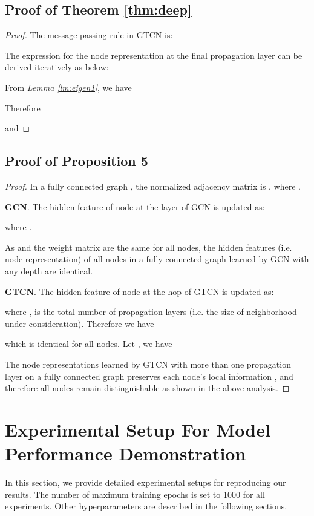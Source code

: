 \documentclass[lettersize,journal]{IEEEtran}
\theoremstyle{plain}
\theoremstyle{definition}
\theoremstyle{remark}
\begin{document}
\subsection{Proof of Theorem \ref{thm:deep}}
\begin{proof}
	The message passing rule in GTCN is:
	

The expression for the node representation at the final propagation layer can be derived iteratively as below:


From \textit{Lemma \ref{lm:eigen1}}, we have


Therefore

and

\end{proof}

\subsection{Proof of Proposition 5}

\begin{proof}
	In a fully connected graph , the normalized adjacency matrix is , where .
	
	\textbf{GCN}. The hidden feature of node  at the  layer of GCN is updated as:
	
	where .
	
	As  and the weight matrix  are the same for all nodes, the hidden features (i.e. node representation) of all nodes in a fully connected graph learned by GCN with any depth are identical.
	
	\textbf{GTCN}. The hidden feature of node  at the  hop of GTCN is updated as:
	
	where ,  is the total number of propagation layers (i.e. the size of neighborhood under consideration). Therefore we have
	
	which is identical for all nodes. Let , we have
	

	The node representations learned by GTCN with more than one propagation layer on a fully connected graph preserves each node's local information , and therefore all nodes remain distinguishable as shown in the above analysis.
\end{proof}

\section{Experimental Setup For Model Performance Demonstration}
\label{exp_setup}

In this section, we provide detailed experimental setups for reproducing our results. The number of maximum training epochs is set to 1000 for all experiments. Other hyperparameters are described in the following sections.
\end{document}
